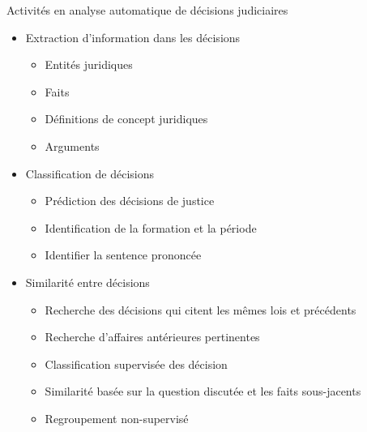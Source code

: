 \begin{frame}[t]{\mysubsectiontitle}
	Activités en analyse automatique de décisions judiciaires	
	\begin{itemize}\scriptsize
		\item Extraction d'information dans les décisions
		\begin{itemize}  \scriptsize
			\item Entités juridiques \cite{Waltl2016lexia, andrew2018legalNerAndRelation}
			\item Faits \cite{wyner2010extractlegalelts, wyner2010casefactors, Shulayeva2017recognfactprincip}
			\item Définitions de concept juridiques \cite{Waltl2016lexia,waltl2017legaliegerman}
			\item Arguments \cite{moens2007NBvsMaxent4arguments}
		\end{itemize}
		\item Classification de décisions
		\begin{itemize} \scriptsize
			\item Prédiction des décisions de justice \cite{Ashley2009classifCases, Aletras2016predictDecisionECHR}
			\item Identification de la formation et la période \cite{Sulea2017predictareadecision,sulea2017legalEnsSVM}
			\item Identifier la sentence prononcée \cite{ma2018wmdchinesecase}
		\end{itemize}
		\item Similarité entre décisions 
		\begin{itemize}  \scriptsize
			\item Recherche des décisions qui citent les mêmes lois et précédents \cite{nair2018judgsimassorule}
			\item Recherche d'affaires antérieures pertinentes  \cite{thenmozhi2017legalprecedretriev}
			\item Classification supervisée des décision \cite{ma2018wmdchinesecase}
			\item Similarité basée sur la question discutée et les faits sous-jacents   \cite{kumar2011judgmentsimilarity}
			\item Regroupement non-supervisé \cite{raghuveer2012legalclusteringLDA}
		\end{itemize}
	\end{itemize}
\end{frame}


